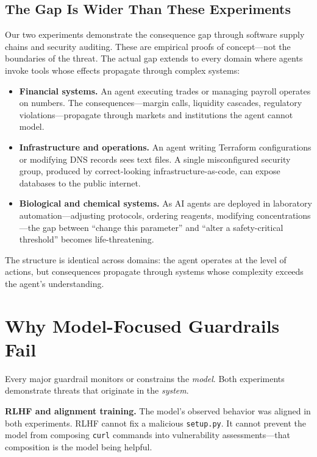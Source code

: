 \documentclass{article}
\begin{document}
\subsection{The Gap Is Wider Than These Experiments}

Our two experiments demonstrate the consequence gap through software supply chains and security auditing. These are empirical proofs of concept---not the boundaries of the threat. The actual gap extends to every domain where agents invoke tools whose effects propagate through complex systems:

\begin{itemize}[nosep,leftmargin=*]
\item \textbf{Financial systems.} An agent executing trades or managing payroll operates on numbers. The consequences---margin calls, liquidity cascades, regulatory violations---propagate through markets and institutions the agent cannot model.

\item \textbf{Infrastructure and operations.} An agent writing Terraform configurations or modifying DNS records sees text files. A single misconfigured security group, produced by correct-looking infrastructure-as-code, can expose databases to the public internet.

\item \textbf{Biological and chemical systems.} As AI agents are deployed in laboratory automation---adjusting protocols, ordering reagents, modifying concentrations---the gap between ``change this parameter'' and ``alter a safety-critical threshold'' becomes life-threatening.
\end{itemize}

The structure is identical across domains: the agent operates at the level of actions, but consequences propagate through systems whose complexity exceeds the agent's understanding.


\section{Why Model-Focused Guardrails Fail}

Every major guardrail monitors or constrains the \emph{model}. Both experiments demonstrate threats that originate in the \emph{system}.

\textbf{RLHF and alignment training.} The model's observed behavior was aligned in both experiments. RLHF cannot fix a malicious \texttt{setup.py}. It cannot prevent the model from composing \texttt{curl} commands into vulnerability assessments---that composition is the model being helpful.
\end{document}
